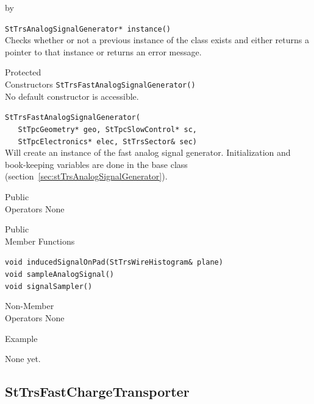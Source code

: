 \documentclass[twoside]{article}
\newcommand{\entrylabel}[1]{\mbox{\textbf{{#1}}}\hfil}%
\newenvironment{entry}
{\begin{list}{}%
    {\renewcommand{\makelabel}{\entrylabel}%
     \setlength{\labelwidth}{90pt}%
     \setlength{\leftmargin}{\labelwidth}
     \advance\leftmargin by \labelsep%
      }%
    }%
  {\end{list}}
\newcommand{\Entrylabel}[1]%
{\raisebox{0pt}[1ex][0pt]{\makebox[\labelwidth][l]%
    {\parbox[t]{\labelwidth}{\hspace{0pt}\textbf{{#1}}}}}}
\newenvironment{Entry}%
{\renewcommand{\entrylabel}{\Entrylabel}\begin{entry}}%
  {\end{entry}}
\begin{document}
\begin{Entry}
   \verb+StTrsAnalogSignalGenerator* instance()+\\
   Checks whether or not a previous instance of the class exists and
   either returns a pointer to that instance or returns an error message.

\item[Protected \\ Constructors]
   \verb+StTrsFastAnalogSignalGenerator()+\\
   No default constructor is accessible.

   \verb+StTrsFastAnalogSignalGenerator(+\\
   \verb+   StTpcGeometry* geo, StTpcSlowControl* sc,+\\
   \verb+   StTpcElectronics* elec, StTrsSector& sec)+\\
   Will create an instance of the fast analog signal generator.  
   Initialization and
   book-keeping variables are done in the base class 
   (section~\ref{sec:stTrsAnalogSignalGenerator}).

\item[Public \\ Operators]
   None

\item[Public \\ Member Functions]

  \verb+void inducedSignalOnPad(StTrsWireHistogram& plane)+\\

  \verb+void sampleAnalogSignal()+\\
 
  \verb+void signalSampler()+\\

\item[Non-Member \\ Operators]
  None

\item[Example]

None yet.

\end{Entry}
\clearpage

%
%
\subsection{StTrsFastChargeTransporter} 
\label{sec:stTrsFastChargeTransporter}
\end{document}
